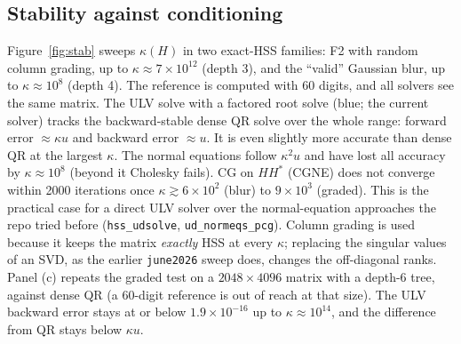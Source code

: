 \subsection{Stability against conditioning}\label{subsec:stab}
Figure~\ref{fig:stab} sweeps $\kappa(H)$ in two exact-HSS families: F2 with random column grading,
up to $\kappa\approx7\times10^{12}$ (depth 3), and the ``valid'' Gaussian blur, up to $\kappa\approx10^8$
(depth 4). The reference is computed with 60 digits, and all solvers see the same matrix. The ULV
solve with a factored root solve (blue; the current solver) tracks the backward-stable dense QR solve over the whole
range: forward error $\approx\kappa u$ and backward error $\approx u$. It is even slightly more accurate than
dense QR at the largest $\kappa$. The normal equations follow $\kappa^2u$ and have lost all accuracy by
$\kappa\approx10^8$ (beyond it Cholesky fails). CG on $HH^*$ (CGNE) does not converge within 2000
iterations once $\kappa\gtrsim6\times10^2$ (blur) to $9\times10^3$ (graded). This is the practical case for a
direct ULV solver over the normal-equation approaches the repo tried before (\texttt{hss\_udsolve},
\texttt{ud\_normeqs\_pcg}). Column grading is used because it keeps the matrix \emph{exactly} HSS at
every $\kappa$; replacing the singular values of an SVD, as the earlier \texttt{june2026} sweep does,
changes the off-diagonal ranks. Panel (c) repeats the graded test on a $2048\times4096$ matrix with a
depth-6 tree, against dense QR (a 60-digit reference is out of reach at that size). The ULV backward error
stays at or below $1.9\times10^{-16}$ up to $\kappa\approx10^{14}$, and the difference from QR stays below $\kappa u$.

